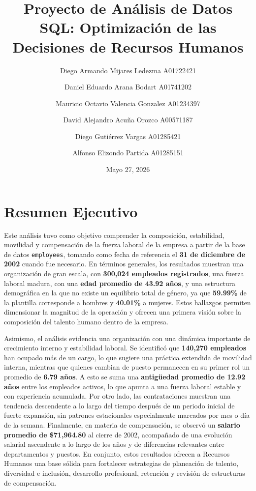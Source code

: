 \documentclass{article}
\title{Proyecto de Análisis de Datos SQL: Optimización de las Decisiones de Recursos Humanos}
\author{Diego Armando Mijares Ledezma A01722421 \and Daniel Eduardo Arana Bodart A01741202 \and Mauricio Octavio Valencia Gonzalez A01234397 \and David Alejandro Acuña Orozco A00571187 \and Diego Gutiérrez Vargas A01285421 \and Alfonso Elizondo Partida A01285151}
\date{Mayo 27, 2026}
\begin{document}
\maketitle
\tableofcontents
\newpage

\section{Resumen Ejecutivo}

Este análisis tuvo como objetivo comprender la composición, estabilidad, movilidad y compensación de la fuerza laboral de la empresa a partir de la base de datos \texttt{employees}, tomando como fecha de referencia el \textbf{31 de diciembre de 2002} cuando fue necesario. En términos generales, los resultados muestran una organización de gran escala, con \textbf{300,024 empleados registrados}, una fuerza laboral madura, con una \textbf{edad promedio de 43.92 años}, y una estructura demográfica en la que no existe un equilibrio total de género, ya que \textbf{59.99\%} de la plantilla corresponde a hombres y \textbf{40.01\%} a mujeres. Estos hallazgos permiten dimensionar la magnitud de la operación y ofrecen una primera visión sobre la composición del talento humano dentro de la empresa.

Asimismo, el análisis evidencia una organización con una dinámica importante de crecimiento interno y estabilidad laboral. Se identificó que \textbf{140,270 empleados} han ocupado más de un cargo, lo que sugiere una práctica extendida de movilidad interna, mientras que quienes cambian de puesto permanecen en su primer rol un promedio de \textbf{6.79 años}. A esto se suma una \textbf{antigüedad promedio de 12.92 años} entre los empleados activos, lo que apunta a una fuerza laboral estable y con experiencia acumulada. Por otro lado, las contrataciones muestran una tendencia descendente a lo largo del tiempo después de un periodo inicial de fuerte expansión, sin patrones estacionales especialmente marcados por mes o día de la semana. Finalmente, en materia de compensación, se observó un \textbf{salario promedio de \$71,964.80} al cierre de 2002, acompañado de una evolución salarial ascendente a lo largo de los años y de diferencias relevantes entre departamentos y puestos. En conjunto, estos resultados ofrecen a Recursos Humanos una base sólida para fortalecer estrategias de planeación de talento, diversidad e inclusión, desarrollo profesional, retención y revisión de estructuras de compensación.
\end{document}
